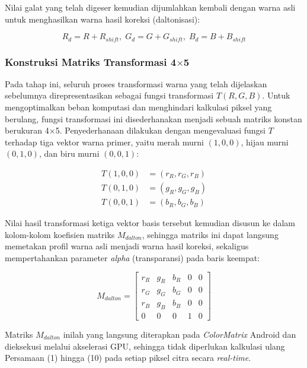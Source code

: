 Nilai galat yang telah digeser kemudian dijumlahkan kembali dengan warna asli untuk menghasilkan warna hasil koreksi (daltonisasi):

\begin{equation}
R_{d} = R + R_{shift}, \; G_{d} = G + G_{shift}, \; B_{d} = B + B_{shift}
\end{equation}

\subsubsection{Konstruksi Matriks Transformasi 4$\times$5}

Pada tahap ini, seluruh proses transformasi warna yang telah dijelaskan sebelumnya direpresentasikan sebagai fungsi transformasi $T(R,G,B)$. Untuk mengoptimalkan beban komputasi dan menghindari kalkulasi piksel yang berulang, fungsi transformasi ini disederhanakan menjadi sebuah matriks konstan berukuran 4$\times$5. Penyederhanaan dilakukan dengan mengevaluasi fungsi $T$ terhadap tiga vektor warna primer, yaitu merah murni $(1,0,0)$, hijau murni $(0,1,0)$, dan biru murni $(0,0,1)$:

\begin{equation}
\begin{aligned}
T(1,0,0) &= (r_R, r_G, r_B) \\
T(0,1,0) &= (g_R, g_G, g_B) \\
T(0,0,1) &= (b_R, b_G, b_B)
\end{aligned}
\end{equation}

Nilai hasil transformasi ketiga vektor basis tersebut kemudian disusun ke dalam kolom-kolom koefisien matriks $M_{dalton}$, sehingga matriks ini dapat langsung memetakan profil warna asli menjadi warna hasil koreksi, sekaligus mempertahankan parameter \textit{alpha} (transparansi) pada baris keempat:

\begin{equation}
M_{dalton} =
\begin{bmatrix}
r_R & g_R & b_R & 0 & 0 \\
r_G & g_G & b_G & 0 & 0 \\
r_B & g_B & b_B & 0 & 0 \\
0 & 0 & 0 & 1 & 0
\end{bmatrix}
\end{equation}

Matriks $M_{dalton}$ inilah yang langsung diterapkan pada \textit{ColorMatrix} Android dan dieksekusi melalui akselerasi GPU, sehingga tidak diperlukan kalkulasi ulang Persamaan (1) hingga (10) pada setiap piksel citra secara \textit{real-time}.

